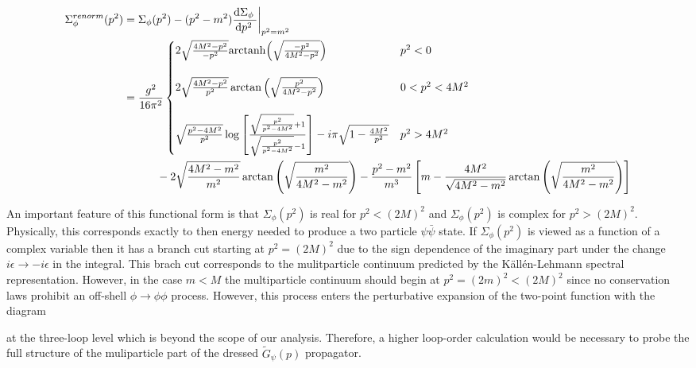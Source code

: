 \documentclass{article}
\begin{document}
\begin{align*}
\Sigma_\phi^{renorm}(p^2) & = \Sigma_\phi(p^2) - (p^2 - m^2) \frac{\mathrm{d}\Sigma_\phi \:}{\mathrm{d}p^2 \:} \bigg|_{p^2 = m^2} 
\\
& = 
\frac{g^2}{16 \pi^2}
\begin{cases}
2 \sqrt{\frac{4 M^2 - p^2}{-p^2}} \mathrm{arctanh}{\left(\sqrt{\frac{-p^2}{4 M^2 - p^2}}\right)} 
& p^2 < 0
\\
&
\\
2 \sqrt{\frac{4 M^2 - p^2}{p^2}} \arctan{\left( \sqrt{\frac{p^2}{4 M^2 - p^2}} \right)} 
& 0 < p^2 < 4 M^2 
\\
&
\\
\sqrt{\frac{p^2 - 4 M^2}{p^2}} \log{\left[ \frac{\sqrt{\frac{p^2}{p^2 - 4 M^2}} + 1}{\sqrt{\frac{p^2}{p^2 - 4 M^2}} - 1} \right]}  - i \pi \sqrt{1 - \frac{4 M^2}{p^2}}
& p^2 > 4 M^2
\end{cases}
\\ 
& \quad \quad \quad 
- 2 \sqrt{\frac{4 M^2 - m^2}{m^2}} \arctan{\left(\sqrt{\frac{m^2}{4 M^2 - m^2}}\right)}
- \frac{p^2 - m^2}{m^3} \left[ m - \frac{4 M^2}{\sqrt{4 M^2 - m^2}} \arctan{\left( \sqrt{\frac{m^2}{4 M^2 - m^2}} \right)} \right]
\end{align*}

An important feature of this functional form is that $\Sigma_\phi(p^2)$ is real for $p^2 < (2 M)^2$ and $\Sigma_\phi(p^2)$ is complex for $p^2 > (2 M)^2$. Physically, this corresponds exactly to then energy needed to produce a two particle $\psi \bar{\psi}$ state. If $\Sigma_\phi(p^2)$ is viewed as a function of a complex variable then it has a branch cut starting at $p^2 = (2 M)^2$ due to the sign dependence of the imaginary part under the change $i \epsilon \to - i \epsilon$ in the integral. This brach cut corresponds to the mulitparticle continuum predicted by the K{\"a}ll{\'e}n-Lehmann spectral representation. However, in the case $m < M$ the multiparticle continuum should begin at $p^2 = (2 m)^2 < (2 M)^2$ since no conservation laws prohibit an off-shell $\phi \to \phi \phi$ process. However, this process enters the perturbative expansion of the two-point function with the diagram
\begin{center}
\end{center}
at the three-loop level which is beyond the scope of our analysis. Therefore, a higher loop-order calculation would be necessary to probe the full structure of the muliparticle part of the dressed $\tilde{G}_{\psi}(p)$ propagator.  
\end{document}
